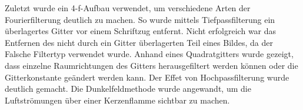\documentclass[
	a4paper,
	12pt,
	pagesize,
	ngerman
]{scrartcl}
\begin{document}
	Zuletzt wurde ein 4-f-Aufbau verwendet, um verschiedene Arten der Fourierfilterung deutlich zu machen.
	So wurde mittels Tiefpassfilterung ein überlagertes Gitter vor einem Schriftzug entfernt.
	Nicht erfolgreich war das Entfernen des nicht durch ein Gitter überlagerten Teil eines Bildes, da der Falsche Filtertyp verwendet wurde.
	Anhand eines Quadratgitters wurde gezeigt, dass einzelne Raumrichtungen des Gitters herausgefiltert werden können oder die Gitterkonstante geändert werden kann.
	Der Effet von Hochpassfilterung wurde deutlich gemacht.
	Die Dunkelfeldmethode wurde angewandt, um die Luftströmungen über einer Kerzenflamme sichtbar zu machen.

	\printbibliography
\end{document}
